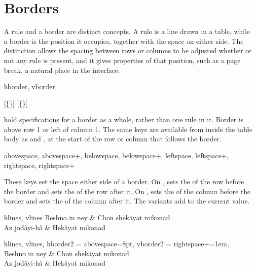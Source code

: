 \section{Borders}\label{inner:borders}
A rule and a border are distinct concepts. A rule is a line drawn in a table, while a border is the position it occupies, together with the space on either side. The distinction allows the spacing between rows or columns to be adjusted whether or not any rule is present, and it gives properties of that position, such as a page break, a natural place in the interface.

\begin{codedescribe}[
    key,
    new=2022A
  ]{hborder, vborder}
  \begin{codesyntax}
    [\{\}]
    [\{\}]
  \end{codesyntax}
   hold specifications for a border as a whole, rather than one rule in it. Border  is above row 1 or left of column 1. The same keys are available from inside the table body as  and , at the start of the row or column that follows the border.
\end{codedescribe}

\begin{codedescribe}[
    key,
    new=2022A
  ]{abovespace, abovespace+, belowspace, belowspace+, leftspace, leftspace+, rightspace, rightspace+}
  \begin{codesyntax}
  \end{codesyntax}
  These keys set the space either side of a border. On ,  sets the  of the row before the border and  sets the  of the row after it. On ,  sets the  of the column before the border and  sets the  of the column after it. The \key[no index]{+} variants add to the current value.

  \begin{codestore}[st=borders:space]
    \begin{tblr}{hlines, vlines}
      Beshno in ney & Chon shekâyat mikonad \\
      Az jodâyi-hâ  & Hekâyat mikonad
    \end{tblr}

    \begin{tblr}{
        hlines, vlines,
        hborder{2} = {abovespace=8pt},
        vborder{2} = {rightspace+=1em},
      }
      Beshno in ney & Chon shekâyat mikonad \\
      Az jodâyi-hâ  & Hekâyat mikonad
    \end{tblr}\end{codestore}
  \begin{center}
  \end{center}
\end{codedescribe}

